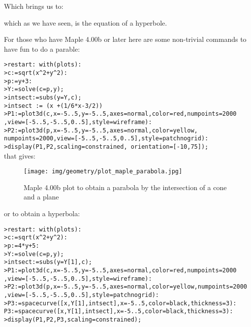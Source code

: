 \begin{enumerate}
\begin{tcolorbox}[title=Remark,colframe=black,arc=10pt]
		Which brings us to:
		
		which as we have seen, is the equation of a hyperbole.
		\end{tcolorbox}
		For those who have Maple 4.00b or later here are some non-trivial commands to have fun to do a parable:
		
		\texttt{>restart: with(plots):}\\
		\texttt{>c:=sqrt(x\string^2+y\string^2):}\\
		\texttt{>p:=y+3:}\\
		\texttt{>Y:=solve(c=p,y);}\\
		\texttt{>intsect:=subs(y=Y,c);}\\
		\texttt{>intsect := (x +(1/6*x-3/2))}\\
		\texttt{>P1:=plot3d(c,x=-5..5,y=-5..5,axes=normal,color=red,numpoints=2000}
		\texttt{,view=[-5..5,-5..5,0..5],style=wireframe):}\\
		\texttt{>P2:=plot3d(p,x=-5..5,y=-5..5,axes=normal,color=yellow,}\\
		\texttt{numpoints=2000,view=[-5..5,-5..5,0..5],style=patchnogrid):}\\
		\texttt{>display(P1,P2,scaling=constrained, orientation=[-10,75]);}\\
		
		that gives:
		\begin{figure}[H]
			\centering
			\texttt{[image: img/geometry/plot\_maple\_parabola.jpg]}
			\caption{Maple 4.00b plot to obtain a parabola by the intersection of a cone and a plane}
		\end{figure}
		or to obtain a hyperbola:
		
		\texttt{>restart: with(plots):}\\
		\texttt{>c:=sqrt(x\string^2+y\string^2):}\\
		\texttt{>p:=4*y+5:}\\
		\texttt{>Y:=solve(c=p,y);}\\
		\texttt{>intsect:=subs(y=Y[1],c);}\\	\texttt{>P1:=plot3d(c,x=-5..5,y=-5..5,axes=normal,color=red,numpoints=2000}\\
		\texttt{,view=[-5..5,-5..5,0..5],style=wireframe):}\\	\texttt{>P2:=plot3d(p,x=-5..5,y=-5..5,axes=normal,color=yellow,numpoints=2000}\\
		\texttt{,view=[-5..5,-5..5,0..5],style=patchnogrid):}\\	\texttt{>P3:=spacecurve([x,Y[1],intsect],x=-5..5,color=black,thickness=3):}\\
	\texttt{P3:=spacecurve([x,Y[1],intsect],x=-5..5,color=black,thickness=3):}\\
		\texttt{>display(P1,P2,P3,scaling=constrained);}\\
		

\end{enumerate}
